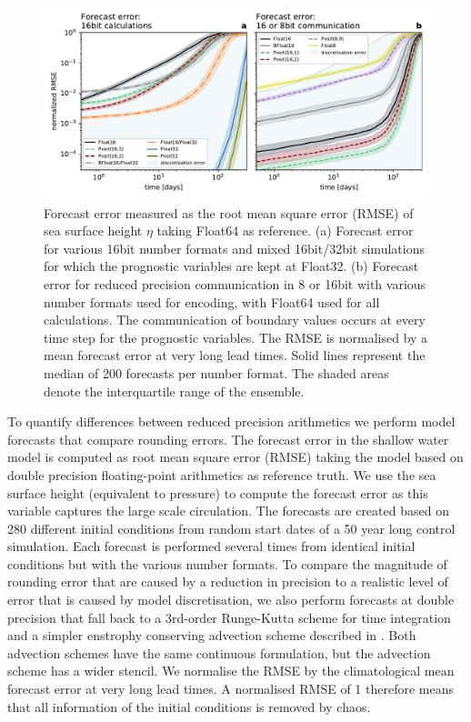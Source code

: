 \documentclass[draft]{agujournal2019}
\begin{document}
\begin{figure}
\includegraphics[width=1\textwidth]{../plots/rmse_eta.pdf}
\caption{Forecast error measured as the root mean square error (RMSE) of sea surface height $\eta$ taking Float64 as reference. (a) Forecast error for various 16bit number formats and mixed 16bit/32bit simulations for which the prognostic variables are kept at Float32. (b) Forecast error for reduced precision communication in 8 or 16bit with various number formats used for encoding, with Float64 used for all calculations.  The communication of boundary values occurs at every time step for the prognostic variables. The RMSE is normalised by a mean forecast error at very long lead times. Solid lines represent the median of 200 forecasts per number format. The shaded areas denote the interquartile range of the ensemble.}
\label{fig:rmse}
\end{figure}

To quantify differences between reduced precision arithmetics we perform model forecasts that compare rounding errors. The forecast error in the shallow water model is computed as root mean square error (RMSE) taking the model based on double precision floating-point arithmetics as reference truth. We use the sea surface height (equivalent to pressure) to compute the forecast error as this variable captures the large scale circulation. The forecasts are created based on 280 different initial conditions from random start dates of a 50 year long control simulation. Each forecast is performed several times from identical initial conditions but with the various number formats. To compare the magnitude of rounding error that are caused by a reduction in precision to a realistic level of error that is caused by model discretisation, we also perform forecasts at double precision that fall back to a 3rd-order Runge-Kutta scheme for time integration and a simpler enstrophy conserving advection scheme described in . Both advection schemes have the same continuous formulation, but the  advection scheme has a wider stencil. We normalise the RMSE by the climatological mean forecast error at very long lead times. A normalised RMSE of 1 therefore means that all information of the initial conditions is removed by chaos.
\end{document}

